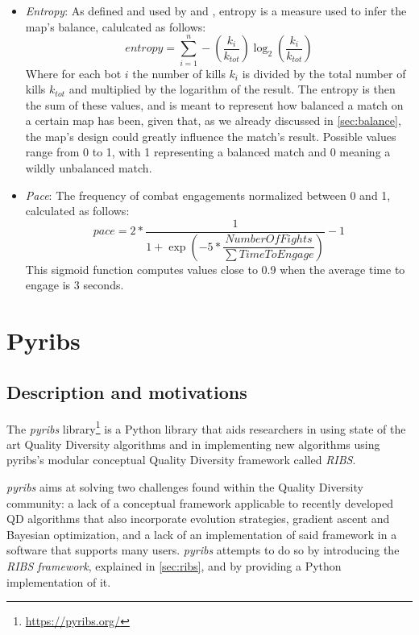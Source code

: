 \documentclass{Configuration_Files/PoliMi3i_thesis}
\begin{document}
\begin{itemize}
    \item \textit{Entropy}: As defined and used by \citet{lanzi_evolving_2014} and \citet{loiacono_fight_2017}, entropy is a measure used to infer the map's balance, calulcated as follows:
    \begin{equation}
        entropy = \sum_{i=1}^{n} - \left(\dfrac{k_i}{k_{tot}}\right) \log_2 \left(\dfrac{k_i}{k_{tot}}\right)
    \end{equation}
    Where for each bot $i$ the number of kills $k_i$ is divided by the total number of kills $k_{tot}$ and multiplied by the logarithm of the result. The entropy is then the sum of these values, and is meant to represent how balanced a match on a certain map has been, given that, as we already discussed in \ref{sec:balance}, the map's design could greatly influence the match's result. Possible values range from 0 to 1, with 1 representing a balanced match and 0 meaning a wildly unbalanced match.
    \item \textit{Pace}: The frequency of combat engagements normalized between 0 and 1, calculated as follows:
    \begin{equation}
        pace = 2 * \dfrac{1}{1 + \exp \left(-5 * \dfrac{NumberOfFights}{\sum TimeToEngage}\right)} - 1
    \end{equation}
    This sigmoid function computes values close to 0.9 when the average time to engage is 3 seconds.

\end{itemize}

\chapter{Pyribs}
\label{ch:pyribs}

\section{Description and motivations}
\label{sec:pyribs_description}
The \textit{pyribs} library\footnote{\url{https://pyribs.org/}} is a Python library that aids researchers in using state of the art Quality Diversity algorithms and in implementing new algorithms using pyribs's modular conceptual Quality Diversity framework called \textit{RIBS}.

\textit{pyribs} aims at solving two challenges found within the Quality Diversity community: a lack of a conceptual framework applicable to  recently developed QD algorithms that also incorporate evolution strategies, gradient ascent and Bayesian optimization, and a lack of an implementation of said framework in a software that supports many users. \textit{pyribs} attempts to do so by introducing the \textit{RIBS framework}, explained in \ref{sec:ribs}, and by providing a Python implementation of it. \cite{tjanaka_pyribs_2023}
\end{document}
